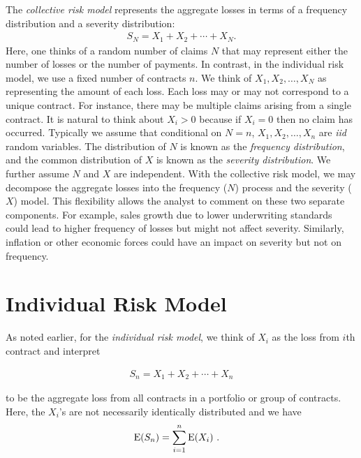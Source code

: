 \documentclass[]{book}
\theoremstyle{definition}
\theoremstyle{definition}
\theoremstyle{definition}
\theoremstyle{remark}
\begin{document}
The \emph{collective risk model} represents the aggregate losses in
terms of a frequency distribution and a severity distribution:
\[\begin{aligned}
S_N=X_1 +X_2 +\cdots+X_N.
\end{aligned}\] Here, one thinks of a random number of claims \(N\) that
may represent either the number of losses or the number of payments. In
contrast, in the individual risk model, we use a fixed number of
contracts \(n\). We think of \(X_1, X_2, \ldots, X_N\) as representing
the amount of each loss. Each loss may or may not correspond to a unique
contract. For instance, there may be multiple claims arising from a
single contract. It is natural to think about \(X_i>0\) because if
\(X_i=0\) then no claim has occurred. Typically we assume that
conditional on \(N=n\), \(X_{1},X_{2},\ldots ,X_{n}\) are \emph{iid}
random variables. The distribution of \(N\) is known as the
\emph{frequency distribution}, and the common distribution of \(X\) is
known as the \emph{severity distribution}. We further assume \(N\) and
\(X\) are independent. With the collective risk model, we may decompose
the aggregate losses into the frequency (\(N\)) process and the severity
(\(X\)) model. This flexibility allows the analyst to comment on these
two separate components. For example, sales growth due to lower
underwriting standards could lead to higher frequency of losses but
might not affect severity. Similarly, inflation or other economic forces
could have an impact on severity but not on frequency.

\section{Individual Risk Model}\label{individual-risk-model}

As noted earlier, for the \emph{individual risk model}, we think of
\(X_i\) as the loss from \(i\)th contract and interpret

\begin{eqnarray*}
S_n=X_1 +X_2 +\cdots+X_n
\end{eqnarray*}

to be the aggregate loss from all contracts in a portfolio or group of
contracts. Here, the \(X_i\)'s are not necessarily identically
distributed and we have \[\begin{aligned}
    {\rm E}(S_n) &= \sum_{i=1}^{n} {\rm E}(X_i)~.
\end{aligned}\]
\end{document}
